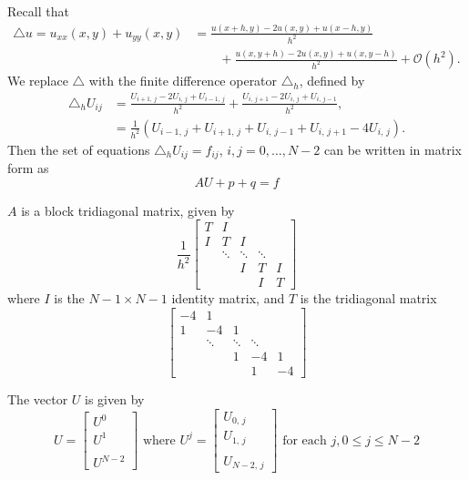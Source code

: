 Recall that 
 \begin{align*}
 \triangle u = u_{xx}(x,y) + u_{yy}(x,y) &= \frac{u(x+h,y) - 2u(x,y)+ u(x-h,y)}{h^2} \\
 & \qquad{}+ 
 \frac{u(x,y+h) - 2u(x,y)+ u(x,y-h)}{h^2} + \mathcal{O}(h^2).
 \end{align*}
 We replace $\triangle $ with the finite difference operator $\triangle_h$, defined by 
 \begin{align*}
 \triangle_h U_{ij} &= \frac{U_{i+1,\,j} - 2U_{i,\,j} + U_{i-1,\,j}}{h^2} + \frac{U_{i,\,j+1} - 2U_{i,\,j}+ U_{i,\,j-1}}{h^2},\\
&= \frac{1}{h^2}(U_{i-1,\,j} + U_{i+1,\,j} + U_{i,\,j-1} + U_{i,\,j+1}-4U_{i,\,j}).
 \end{align*}
 Then the set of equations  $\triangle_h U_{ij} = f_{ij}$, $i,j = 0,\ldots,N-2$ %
can be written in matrix form as
 \[AU + p +  q  = f\]

$A$ is a block tridiagonal matrix, given by 
\[\frac{1}{h^2}
\begin{bmatrix}
T & I & &  &\\
I &T & I & &\\
&\ddots  & \ddots & \ddots & \\
&  & I & T & I \\
&  &  & I & T\end{bmatrix}\]
where $I$ is the $N-1\times N-1$ %
identity matrix, and $T$ is the tridiagonal matrix
\[\begin{bmatrix}
-4 & 1 & &  &\\
1 &-4 & 1 & &\\
&\ddots  & \ddots & \ddots & \\
&  & 1 & -4 & 1 \\
&  &  & 1 & -4 \end{bmatrix}\]

The vector $U$ is given by 
\[U = \begin{bmatrix} U^0 \\ U^1 \\ \\ U^{N-2} \end{bmatrix} \text{ where } U^j = 
\begin{bmatrix} U_{0,\,j} \\ U_{1,\,j} \\ \\ U_{N-2,\,j} \end{bmatrix} \text{ for each } j, 0\leq j \leq N-2\]


